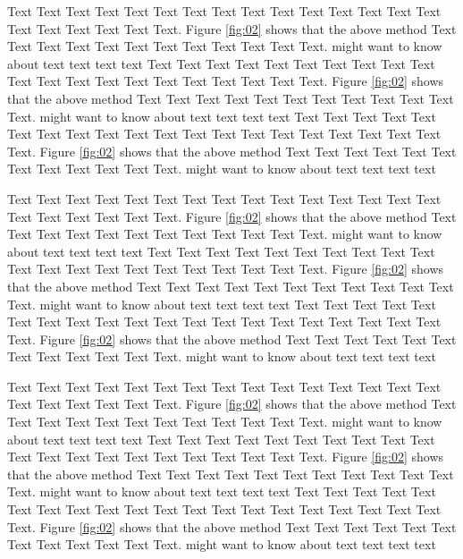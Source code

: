 \documentclass{bioinfo}
\begin{document}
\begin{methods}
Text Text Text Text Text Text  Text Text Text Text Text Text Text Text Text  Text Text Text Text Text Text. Figure \ref{fig:02} shows that the above method  Text Text Text Text  Text Text Text Text Text Text  Text Text.  \citealp{shortread} might want to know about  text text text text
Text Text Text Text Text Text  Text Text Text Text Text Text Text Text Text  Text Text Text Text Text Text. Figure \ref{fig:02} shows that the above method  Text Text Text Text  Text Text Text Text Text Text  Text Text.  \citealp{shortread} might want to know about  text text text text
Text Text Text Text Text Text  Text Text Text Text Text Text Text Text Text  Text Text Text Text Text Text. Figure \ref{fig:02} shows that the above method  Text Text Text Text  Text Text Text Text Text Text  Text Text.  \citealp{shortread} might want to know about  text text text text



Text Text Text Text Text Text  Text Text Text Text Text Text Text Text Text  Text Text Text Text Text Text. Figure \ref{fig:02} shows that the above method  Text Text Text Text  Text Text Text Text Text Text  Text Text.  \citealp{shortread} might want to know about  text text text text
Text Text Text Text Text Text  Text Text Text Text Text Text Text Text Text  Text Text Text Text Text Text. Figure \ref{fig:02} shows that the above method  Text Text Text Text  Text Text Text Text Text Text  Text Text.  \citealp{shortread} might want to know about  text text text text
Text Text Text Text Text Text  Text Text Text Text Text Text Text Text Text  Text Text Text Text Text Text. Figure \ref{fig:02} shows that the above method  Text Text Text Text  Text Text Text Text Text Text  Text Text.  \citealp{shortread} might want to know about  text text text text


Text Text Text Text Text Text  Text Text Text Text Text Text Text Text Text  Text Text Text Text Text Text. Figure \ref{fig:02} shows that the above method  Text Text Text Text  Text Text Text Text Text Text  Text Text.  \citealp{shortread} might want to know about  text text text text
Text Text Text Text Text Text  Text Text Text Text Text Text Text Text Text  Text Text Text Text Text Text. Figure \ref{fig:02} shows that the above method  Text Text Text Text  Text Text Text Text Text Text  Text Text.  \citealp{shortread} might want to know about  text text text text
Text Text Text Text Text Text  Text Text Text Text Text Text Text Text Text  Text Text Text Text Text Text. Figure \ref{fig:02} shows that the above method  Text Text Text Text  Text Text Text Text Text Text  Text Text.  \citealp{shortread} might want to know about  text text text text




\end{methods}
\end{document}
